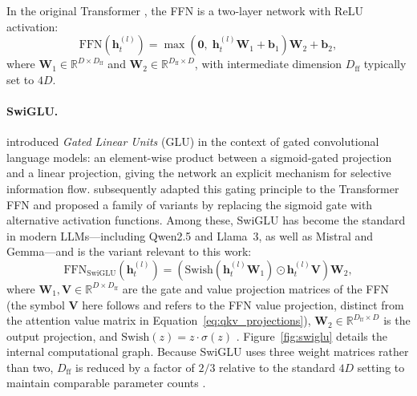 In the original Transformer \citep{vaswani2017attention}, the FFN is a two-layer
network with ReLU activation:
\begin{equation}
    \mathrm{FFN}\!\left(\mathbf{h}_t^{(l)}\right)
    =
    \max\!\left(\mathbf{0},\; \mathbf{h}_t^{(l)}\mathbf{W}_1 + \mathbf{b}_1\right)
    \mathbf{W}_2 + \mathbf{b}_2,
    \label{eq:ffn_original}
\end{equation}
where $\mathbf{W}_1 \in \mathbb{R}^{D \times D_{\mathrm{ff}}}$ and
$\mathbf{W}_2 \in \mathbb{R}^{D_{\mathrm{ff}} \times D}$, with intermediate
dimension $D_{\mathrm{ff}}$ typically set to $4D$.

\paragraph{SwiGLU.}
\citet{dauphin2017language} introduced \emph{Gated Linear Units} (GLU) in the
context of gated convolutional language models: an element-wise product between a
sigmoid-gated projection and a linear projection, giving the network an explicit
mechanism for selective information flow. \citet{shazeer2020glu} subsequently
adapted this gating principle to the Transformer FFN and proposed a family of
variants by replacing the sigmoid gate with alternative activation functions. Among
these, SwiGLU has become the standard in modern LLMs—including Qwen2.5 and Llama~3,
as well as Mistral and Gemma—and is the variant relevant to this work:
\begin{equation}
    \mathrm{FFN}_{\mathrm{SwiGLU}}\!\left(\mathbf{h}_t^{(l)}\right)
    =
    \left(
        \mathrm{Swish}\!\left(\mathbf{h}_t^{(l)}\mathbf{W}_1\right)
        \odot
        \mathbf{h}_t^{(l)}\mathbf{V}
    \right)\mathbf{W}_2,
    \label{eq:swiglu}
\end{equation}
where $\mathbf{W}_1, \mathbf{V} \in \mathbb{R}^{D \times D_{\mathrm{ff}}}$ are the
gate and value projection matrices of the FFN (the symbol $\mathbf{V}$ here follows
\citealt{shazeer2020glu} and refers to the FFN value projection, distinct from the
attention value matrix in Equation~\ref{eq:qkv_projections}),
$\mathbf{W}_2 \in \mathbb{R}^{D_{\mathrm{ff}} \times D}$ is the output projection,
and $\mathrm{Swish}(z) = z \cdot \sigma(z)$ \citep{ramachandran2017searching}.
Figure~\ref{fig:swiglu} details the internal computational graph.
Because SwiGLU uses three weight matrices rather than two, $D_{\mathrm{ff}}$ is
reduced by a factor of $2/3$ relative to the standard $4D$ setting to maintain
comparable parameter counts \citep{shazeer2020glu}.

